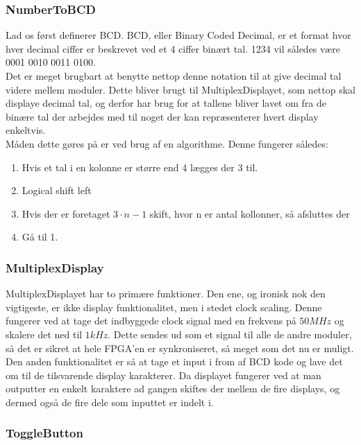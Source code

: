 \subsubsection{NumberToBCD}

Lad os først definerer BCD. BCD, eller Binary Coded Decimal, er et format hvor hver decimal ciffer er beskrevet ved et 4 ciffer binært tal. 1234 vil således være 0001 0010 0011 0100.
\\
Det er meget brugbart at benytte nettop denne notation til at give decimal tal videre mellem moduler. Dette bliver brugt til MultiplexDisplayet, som nettop skal displaye decimal tal, og derfor har brug for at tallene bliver lavet om fra de binære tal der arbejdes med til noget der kan repræsenterer hvert display enkeltvis.
\\
Måden dette gøres på er ved brug af en algorithme. Denne fungerer således:

\begin{enumerate}
\item Hvis et tal i en kolonne er større end 4 lægges der 3 til.
\item Logical shift left
\item Hvis der er foretaget $3 \cdot n - 1$ skift, hvor n er antal kollonner, så afsluttes der
\item Gå til 1.
\end{enumerate}

\subsubsection{MultiplexDisplay}

MultiplexDisplayet har to primære funktioner. Den ene, og ironisk nok den vigtigeste, er ikke display funktionalitet, men i stedet clock scaling. Denne fungerer ved at tage det indbyggede clock signal med en frekvens på $50 MHz$ og skalere det ned til $1 kHz$. Dette sendes ud som et signal til alle de andre moduler, så det er sikret at hele FPGA'en er synkroniseret, så meget som det nu er muligt.
\\
Den anden funktionalitet er så at tage et input i from af BCD kode og lave det om til de tilsvarende display karakterer. Da displayet fungerer ved at man outputter en enkelt karaktere ad gangen skiftes der mellem de fire displays, og dermed også de fire dele som inputtet er indelt i.

\subsubsection{ToggleButton}

